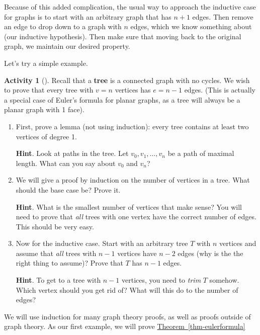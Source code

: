 \documentclass[10pt,]{book}
\newcommand{\terminology}[1]{\textbf{#1}}
\theoremstyle{plain}
\theoremstyle{definition}
\theoremstyle{definition}
\theoremstyle{definition}
\newtheorem{activity}[project]{Activity}
\numberwithin{equation}{chapter}
\begin{document}
\par
\hypertarget{p-239}{}%
Because of this added complication, the usual way to approach the inductive case for graphs is to start with an arbitrary graph that has \(n+1\) edges.  Then remove an edge to drop down to a graph with \(n\) edges, which we know something about (our inductive hypothesis).  Then make sure that moving back to the original graph, we maintain our desired property.%
\par
\hypertarget{p-240}{}%
Let's try a simple example.%
\begin{activity}[]\label{activity-18}
\hypertarget{p-241}{}%
Recall that a \terminology{tree} is a connected graph with no cycles.  We wish to prove that every tree with \(v = n\) vertices has \(e = n-1\) edges.  (This is actually a special case of Euler's formula for planar graphs, as a tree will always be a planar graph with 1 face).%
\begin{enumerate}[font=\bfseries,label=(\alph*),ref=\alph*]
\item\label{task-26} \hypertarget{p-242}{}%
First, prove a lemma (not using induction): every tree contains at least two vertices of degree 1.%
\par\smallskip%
\noindent\textbf{Hint}.\hypertarget{hint-4}{}\quad%
\hypertarget{p-243}{}%
Look at paths in the tree.  Let \(v_0, v_1, \ldots, v_n\) be a path of maximal length.  What can you say about \(v_0\) and \(v_n\)?%
\item\label{task-27} \hypertarget{p-244}{}%
We will give a proof by induction on the number of vertices in a tree.  What should the base case be?  Prove it.%
\par\smallskip%
\noindent\textbf{Hint}.\hypertarget{hint-5}{}\quad%
\hypertarget{p-245}{}%
What is the smallest number of vertices that make sense?  You will need to prove that \emph{all} trees with one vertex have the correct number of edges.  This should be very easy.%
\item\label{task-28} \hypertarget{p-246}{}%
Now for the inductive case.  Start with an arbitrary tree \(T\) with \(n\) vertices and assume that \emph{all} trees with \(n-1\) vertices have \(n-2\) edges (why is the the right thing to assume)?  Prove that \(T\) has \(n-1\) edges.%
\par\smallskip%
\noindent\textbf{Hint}.\hypertarget{hint-6}{}\quad%
\hypertarget{p-247}{}%
To get to a tree with \(n-1\) vertices, you need to \emph{trim} \(T\) somehow.  Which vertex should you get rid of?  What will this do to the number of edges?%
\end{enumerate}
\end{activity}
\hypertarget{p-248}{}%
We will use induction for many graph theory proofs, as well as proofs outside of graph theory.  As our first example, we will prove \hyperref[thm-eulerformula]{Theorem~\ref{thm-eulerformula}}%
\typeout{************************************************}
\typeout{************************************************}
\end{document}
